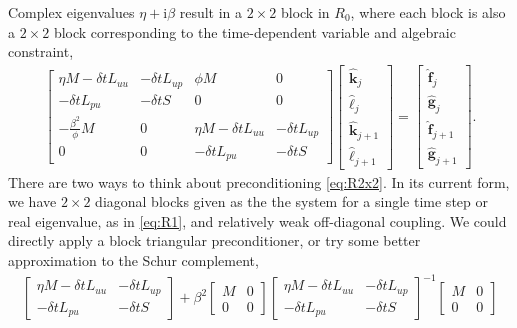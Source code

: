 \documentclass[a4paper,10pt]{article}
\begin{document}
Complex eigenvalues $\eta + \mathrm{i}\beta$ result in a $2\times 2$ block
in $R_0$, where each block is also a $2\times 2$ block corresponding to the
time-dependent variable and algebraic constraint,
%
\begin{align}\label{eq:R2x2}
\begin{bmatrix}
	\eta M - \delta tL_{uu} & -\delta tL_{up} & \phi M & 0 \\
		-\delta tL_{pu} & -\delta tS & 0 & 0 \\
	-\frac{\beta^2}{\phi}M & 0 & \eta M - \delta tL_{uu} & -\delta tL_{up} \\
	0 & 0 & -\delta tL_{pu} & -\delta tS
	\end{bmatrix}
	\begin{bmatrix} \hat{\mathbf{k}}_j \\ \hat{\ell}_j \\
		\hat{\mathbf{k}}_{j+1} \\ \hat{\ell}_{j+1} \end{bmatrix} =
	\begin{bmatrix} \hat{\mathbf{f}}_j \\ \hat{\mathbf{g}}_j \\
		\hat{\mathbf{f}}_{j+1} \\ \hat{\mathbf{g}}_{j+1} \end{bmatrix}.
\end{align}
%
There are two ways to think about preconditioning \eqref{eq:R2x2}. In 
its current form, we have $2\times 2$ diagonal blocks given as the the
system for a single time step or real eigenvalue, as in \eqref{eq:R1},
and relatively weak off-diagonal coupling. We could directly apply a
block triangular preconditioner, or try some better approximation to
the Schur complement,
%
\begin{align*}
\begin{bmatrix} \eta M - \delta tL_{uu} & -\delta tL_{up} \\ -\delta tL_{pu} & -\delta tS
		\end{bmatrix} +
	\beta^2 \begin{bmatrix} M & 0 \\ 0 & 0 \end{bmatrix}
	\begin{bmatrix} \eta M - \delta tL_{uu} & -\delta tL_{up} \\ -\delta tL_{pu} & -\delta tS
	\end{bmatrix}^{-1}
	\begin{bmatrix} M & 0 \\ 0 & 0 \end{bmatrix}
\end{align*}
\end{document}

